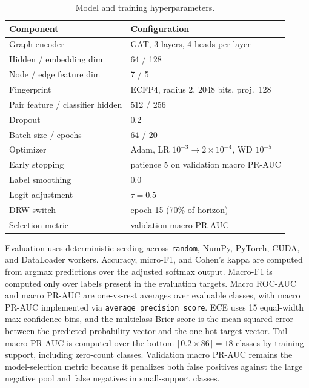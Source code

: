 \documentclass[11pt,a4paper]{report}
\begin{document}
\begin{table}[H]
\centering
\caption{Model and training hyperparameters.}
\label{tab:hyperparams}
\begin{tabular}{ll}
\toprule
Component & Configuration \\
\midrule
Graph encoder            & GAT, 3 layers, 4 heads per layer \\
Hidden / embedding dim   & 64 / 128 \\
Node / edge feature dim  & 7 / 5 \\
Fingerprint              & ECFP4, radius 2, 2048 bits, proj.\ 128 \\
Pair feature / classifier hidden & 512 / 256 \\
Dropout                  & 0.2 \\
Batch size / epochs      & 64 / 20 \\
Optimizer                & Adam, LR $10^{-3}$$\to$$2\!\times\!10^{-4}$, WD $10^{-5}$ \\
Early stopping          & patience 5 on validation macro PR-AUC \\
Label smoothing         & 0.0 \\
Logit adjustment         & $\tau = 0.5$ \\
DRW switch               & epoch 15 (70\% of horizon) \\
Selection metric         & validation macro PR-AUC \\
\bottomrule
\end{tabular}
\end{table}

Evaluation uses deterministic seeding across \texttt{random}, NumPy, PyTorch, CUDA, and DataLoader workers. Accuracy, micro-F1, and Cohen's kappa are computed from argmax predictions over the adjusted softmax output. Macro-F1 is computed only over labels present in the evaluation targets. Macro ROC-AUC and macro PR-AUC are one-vs-rest averages over evaluable classes, with macro PR-AUC implemented via \texttt{average\_precision\_score}. ECE uses 15 equal-width max-confidence bins, and the multiclass Brier score is the mean squared error between the predicted probability vector and the one-hot target vector. Tail macro PR-AUC is computed over the bottom \(\lceil 0.2 \times 86 \rceil = 18\) classes by training support, including zero-count classes. Validation macro PR-AUC remains the model-selection metric because it penalizes both false positives against the large negative pool and false negatives in small-support classes.
\end{document}
